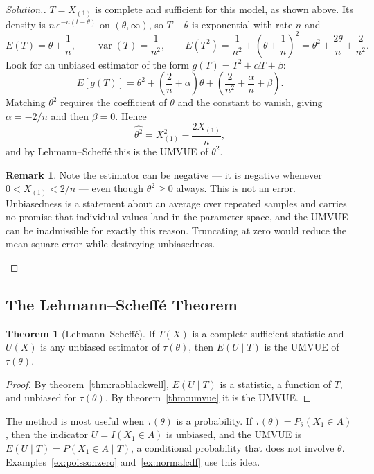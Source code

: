 \documentclass[12pt,a4paper]{report}
\theoremstyle{definition}
\newtheorem{thm}{Theorem}[section]
\newtheorem*{remark}{Remark}
\DeclareMathOperator{\var}{var}
\newenvironment{solution}
  {\renewcommand{\qedsymbol}{}\begin{proof}[\textit{Solution}.]}
  {\end{proof}}
\begin{document}
\begin{solution}
$T=X_{(1)}$ is complete and sufficient for this model, as shown above. Its
density is $n\,e^{-n(t-\theta)}$ on $(\theta,\infty)$, so $T-\theta$ is
exponential with rate $n$ and
\[E(T) = \theta + \frac{1}{n},\qquad
\var(T) = \frac{1}{n^{2}},\qquad
E\left(T^{2}\right) = \frac{1}{n^{2}} + \left(\theta+\frac1n\right)^{2}
= \theta^{2} + \frac{2\theta}{n} + \frac{2}{n^{2}} .\]
Look for an unbiased estimator of the form $g(T)=T^{2}+\alpha T+\beta$:
\[E\left[g(T)\right]
= \theta^{2} + \left(\frac{2}{n}+\alpha\right)\theta
  + \left(\frac{2}{n^{2}} + \frac{\alpha}{n} + \beta\right).\]
Matching $\theta^{2}$ requires the coefficient of $\theta$ and the constant to
vanish, giving $\alpha=-2/n$ and then $\beta=0$. Hence
\[\widehat{\theta^{2}} = X_{(1)}^{2} - \frac{2X_{(1)}}{n},\]
and by Lehmann--Scheff\'e this is the UMVUE of $\theta^{2}$.

\begin{remark}
Note the estimator can be negative --- it is negative whenever
$0<X_{(1)}<2/n$ --- even though $\theta^{2}\geq0$ always. This is not an error.
Unbiasedness is a statement about an average over repeated samples and carries
no promise that individual values land in the parameter space, and the UMVUE can
be inadmissible for exactly this reason. Truncating at zero would reduce the
mean square error while destroying unbiasedness.
\end{remark}
\end{solution}

\subsection{The Lehmann--Scheff\'e Theorem}

\begin{thm}[Lehmann--Scheff\'e]
\label{thm:lehmannscheffe}
If $T(X)$ is a complete sufficient statistic and $U(X)$ is any unbiased estimator
of $\tau(\theta)$, then $E(U\mid T)$ is the UMVUE of $\tau(\theta)$.
\end{thm}

\begin{proof}
By theorem~\ref{thm:raoblackwell}, $E(U\mid T)$ is a statistic, a function of $T$,
and unbiased for $\tau(\theta)$. By theorem~\ref{thm:umvue} it is the UMVUE.
\end{proof}

The method is most useful when $\tau(\theta)$ is a probability. If
$\tau(\theta) = P_\theta(X_1\in A)$, then the indicator $U = I(X_1\in A)$ is unbiased,
and the UMVUE is $E(U\mid T) = P(X_1\in A\mid T)$, a conditional probability that
does not involve $\theta$. Examples~\ref{ex:poissonzero} and~\ref{ex:normalcdf} use
this idea.
\end{document}
